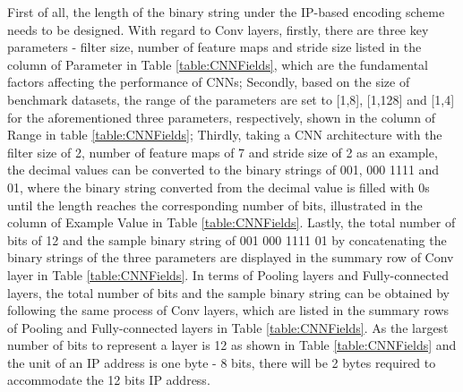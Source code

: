 \documentclass[conference]{IEEEtran}
\begin{document}
First of all, the length of the binary string under the IP-based encoding scheme needs to be designed. With regard to Conv layers, firstly, there are three key parameters - filter size, number of feature maps and stride size listed in the column of Parameter in Table \ref{table:CNNFields}, which are the fundamental factors affecting the performance of CNNs; Secondly, based on the size of benchmark datasets, the range of the parameters are set to [1,8], [1,128] and [1,4] for the aforementioned three parameters, respectively, shown in the column of Range in table \ref{table:CNNFields}; Thirdly, taking a CNN architecture with the filter size of 2, number of feature maps of 7 and stride size of 2 as an example, the decimal values can be converted to the binary strings of 001, 000 1111 and 01, where the binary string converted from the decimal value is filled with 0s until the length reaches the corresponding number of bits, illustrated in the column of Example Value in Table \ref{table:CNNFields}. Lastly, the total number of bits of 12 and the sample binary string of 001 000 1111 01 by concatenating the binary strings of the three parameters are displayed in the summary row of Conv layer in Table \ref{table:CNNFields}. In terms of Pooling layers and Fully-connected layers, the total number of bits and the sample binary string can be obtained by following the same process of Conv layers, which are listed in the summary rows of Pooling and Fully-connected layers in Table \ref{table:CNNFields}.  As the largest number of bits to represent a layer is 12 as shown in Table \ref{table:CNNFields} and the unit of an IP address is one byte - 8 bits, there will be 2 bytes required to accommodate the 12 bits IP address. 
\end{document}
